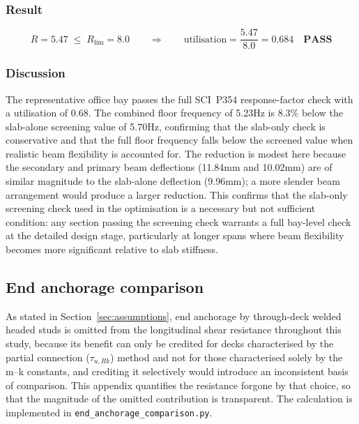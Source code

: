 \subsubsection*{Result}

\begin{equation}
    R = 5.47 \;\leq\; R_\mathrm{lim} = 8.0 \qquad \Rightarrow \qquad
    \text{utilisation} = \frac{5.47}{8.0} = 0.684 \quad \textbf{PASS}
\end{equation}

\subsubsection*{Discussion}

The representative office bay passes the full SCI~P354 response-factor check with a utilisation of 0.68. The combined floor frequency of 5.23Hz is 8.3\% below the slab-alone screening value of 5.70Hz, confirming that the slab-only check is conservative and that the full floor frequency falls below the screened value when realistic beam flexibility is accounted for. The reduction is modest here because the secondary and primary beam deflections (11.84mm and 10.02mm) are of similar magnitude to the slab-alone deflection (9.96mm); a more slender beam arrangement would produce a larger reduction. This confirms that the slab-only screening check used in the optimisation is a necessary but not sufficient condition: any section passing the screening check warrants a full bay-level check at the detailed design stage, particularly at longer spans where beam flexibility becomes more significant relative to slab stiffness.

\subsection{End anchorage comparison}
\label{app:end_anchorage}
As stated in Section~\ref{sec:assumptions}, end anchorage by through-deck welded headed studs is omitted from the longitudinal shear resistance throughout this study, because its benefit can only be credited for decks characterised by the partial connection ($\tau_{u,Rk}$) method and not for those characterised solely by the m--k constants, and crediting it selectively would introduce an inconsistent basis of comparison. This appendix quantifies the resistance forgone by that choice, so that the magnitude of the omitted contribution is transparent. The calculation is implemented in \texttt{end\_anchorage\_comparison.py}.

